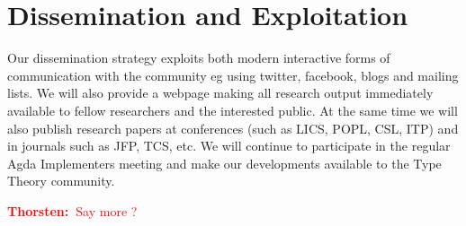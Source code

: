\documentclass[twocolumn,a4paper,11pt]{article}
\newcommand{\txa}[1]{\textcolor{red}{\textbf{Thorsten:~}#1}}
\begin{document}






\section{Dissemination and Exploitation}

Our dissemination strategy exploits both modern interactive forms of
communication with the community eg using twitter, facebook, blogs and
mailing lists. We will also provide a webpage making all research
output immediately available to fellow researchers and the interested
public. At the same time we will also publish research papers at
conferences (such as LICS, POPL, CSL, ITP) and in journals such as JFP,
TCS, etc. We will continue to participate in the regular Agda
Implementers meeting and make our developments available to the Type
Theory community.  

\txa{Say more ?}


{\small

 
}
\end{document}
